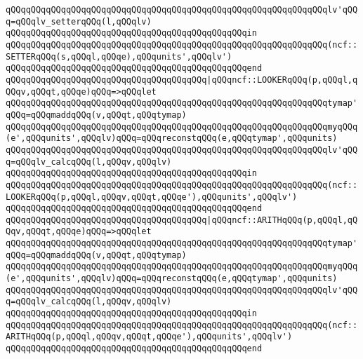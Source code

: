 \verb|qQQqqQQqqQQqqQQqqQQqqQQqqQQqqQQqqQQqqQQqqQQqqQQqqQQqqQQqqQQqqQQqlv'qQQq=qQQqlv_setterqQQq(l,qQQqlv)|\newline
\verb|qQQqqQQqqQQqqQQqqQQqqQQqqQQqqQQqqQQqqQQqqQQqqQQqin|\newline
\verb|qQQqqQQqqQQqqQQqqQQqqQQqqQQqqQQqqQQqqQQqqQQqqQQqqQQqqQQqqQQqqQQq(ncf::SETTERqQQq(s,qQQql,qQQqe),qQQqunits',qQQqlv')|\newline
\verb|qQQqqQQqqQQqqQQqqQQqqQQqqQQqqQQqqQQqqQQqqQQqqQQqend|\newline
\verb|qQQqqQQqqQQqqQQqqQQqqQQqqQQqqQQqqQQqqQQq|\verb#|qQQqncf::LOOKERqQQq(p,qQQql,qQQqv,qQQqt,qQQqe)qQQq=>qQQqlet#\newline
\verb|qQQqqQQqqQQqqQQqqQQqqQQqqQQqqQQqqQQqqQQqqQQqqQQqqQQqqQQqqQQqqQQqtymap'qQQq=qQQqmaddqQQq(v,qQQqt,qQQqtymap)|\newline
\verb|qQQqqQQqqQQqqQQqqQQqqQQqqQQqqQQqqQQqqQQqqQQqqQQqqQQqqQQqqQQqqQQqmyqQQq(e',qQQqunits',qQQqlv)qQQq=qQQqreconstqQQq(e,qQQqtymap',qQQqunits)|\newline
\verb|qQQqqQQqqQQqqQQqqQQqqQQqqQQqqQQqqQQqqQQqqQQqqQQqqQQqqQQqqQQqqQQqlv'qQQq=qQQqlv_calcqQQq(l,qQQqv,qQQqlv)|\newline
\verb|qQQqqQQqqQQqqQQqqQQqqQQqqQQqqQQqqQQqqQQqqQQqqQQqin|\newline
\verb|qQQqqQQqqQQqqQQqqQQqqQQqqQQqqQQqqQQqqQQqqQQqqQQqqQQqqQQqqQQqqQQq(ncf::LOOKERqQQq(p,qQQql,qQQqv,qQQqt,qQQqe'),qQQqunits',qQQqlv')|\newline
\verb|qQQqqQQqqQQqqQQqqQQqqQQqqQQqqQQqqQQqqQQqqQQqqQQqend|\newline
\verb|qQQqqQQqqQQqqQQqqQQqqQQqqQQqqQQqqQQqqQQq|\verb#|qQQqncf::ARITHqQQq(p,qQQql,qQQqv,qQQqt,qQQqe)qQQq=>qQQqlet#\newline
\verb|qQQqqQQqqQQqqQQqqQQqqQQqqQQqqQQqqQQqqQQqqQQqqQQqqQQqqQQqqQQqqQQqtymap'qQQq=qQQqmaddqQQq(v,qQQqt,qQQqtymap)|\newline
\verb|qQQqqQQqqQQqqQQqqQQqqQQqqQQqqQQqqQQqqQQqqQQqqQQqqQQqqQQqqQQqqQQqmyqQQq(e',qQQqunits',qQQqlv)qQQq=qQQqreconstqQQq(e,qQQqtymap',qQQqunits)|\newline
\verb|qQQqqQQqqQQqqQQqqQQqqQQqqQQqqQQqqQQqqQQqqQQqqQQqqQQqqQQqqQQqqQQqlv'qQQq=qQQqlv_calcqQQq(l,qQQqv,qQQqlv)|\newline
\verb|qQQqqQQqqQQqqQQqqQQqqQQqqQQqqQQqqQQqqQQqqQQqqQQqin|\newline
\verb|qQQqqQQqqQQqqQQqqQQqqQQqqQQqqQQqqQQqqQQqqQQqqQQqqQQqqQQqqQQqqQQq(ncf::ARITHqQQq(p,qQQql,qQQqv,qQQqt,qQQqe'),qQQqunits',qQQqlv')|\newline
\verb|qQQqqQQqqQQqqQQqqQQqqQQqqQQqqQQqqQQqqQQqqQQqqQQqend|\newline
